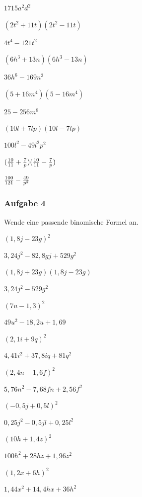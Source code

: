 \documentclass[
  ngerman,
]{book}
\begin{document}
\leavevmode\hypertarget{toggleText67}{}%
\(1715a^2d^2\)

\((2t^2+11t)(2t^2-11t)\)

\leavevmode\hypertarget{toggleText68}{}%
\(4t^4-121t^2\)

\((6h^3+13n)(6h^3-13n)\)

\leavevmode\hypertarget{toggleText69}{}%
\(36h^6-169n^2\)

\((5+16m^4)(5-16m^4)\)

\leavevmode\hypertarget{toggleText70}{}%
\(25-256m^8\)

\((10l+7lp)(10l-7lp)\)

\leavevmode\hypertarget{toggleText71}{}%
\(100l^2-49l^2p^2\)

\(({10 \over 11}+{7 \over p})({10 \over 11}-{7 \over p})\)

\leavevmode\hypertarget{toggleText72}{}%
\({100 \over 121} - {49 \over p^2}\)

\hypertarget{aufgabe-4}{%
\subsubsection*{Aufgabe 4}\label{aufgabe-4}}

Wende eine passende binomische Formel an.

\((1,8j-23g)^2\)

\leavevmode\hypertarget{toggleText73}{}%
\(3,24j^2-82,8gj+529g^2\)

\((1,8j+23g)(1,8j-23g)\)

\leavevmode\hypertarget{toggleText74}{}%
\(3,24j^2-529g^2\)

\((7u-1,3)^2\)

\leavevmode\hypertarget{toggleText75}{}%
\(49u^2-18,2u+1,69\)

\((2,1i+9q)^2\)

\leavevmode\hypertarget{toggleText76}{}%
\(4,41i^2+37,8iq+81q^2\)

\((2,4n-1,6f)^2\)

\leavevmode\hypertarget{toggleText77}{}%
\(5,76n^2-7,68fn+2,56f^2\)

\((-0,5j+0,5l)^2\)

\leavevmode\hypertarget{toggleText78}{}%
\(0,25j^2-0,5jl+0,25l^2\)

\((10h+1,4z)^2\)

\leavevmode\hypertarget{toggleText79}{}%
\(100h^2+28hz+1,96z^2\)

\((1,2x+6h)^2\)

\leavevmode\hypertarget{toggleText80}{}%
\(1,44x^2+14,4hx+36h^2\)
\end{document}
